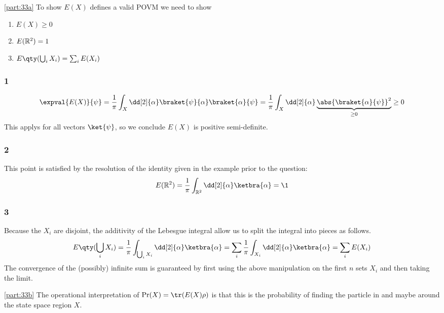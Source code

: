 \documentclass[
	pages,
	boxes,
	color=RoyalPurple
]{homework}
\makeatletter
\numberwithin{tcb@cnt@prob}{section}
\makeatother
\begin{document}
\begin{solution}
    \ref{part:33a}
    To show $E(X)$ defines a valid \ac{POVM} we need to show
    \begin{enumerate}
        \item $E(X)\geq 0$
        \item $E(\mathbb{R}^2) = 1$
        \item $E\qty(\bigcup_i X_i) = \sum_i E(X_i)$
    \end{enumerate}
    \subsubsection*{1}
    \begin{equation*}
        \expval{E(X)}{\psi} = \frac{1}{\pi}\int_X\dd[2]{\alpha}\braket{\psi}{\alpha}\braket{\alpha}{\psi} = \frac{1}{\pi}\int_X\dd[2]{\alpha}\underbrace{\abs{\braket{\alpha}{\psi}}^2}_{\geq 0} \geq 0
    \end{equation*}
    This applys for all vectors $\ket{\psi}$, so we conclude $E(X)$ is positive semi-definite.
    \subsubsection*{2}
    This point is satisfied by the resolution of the identity given in the example prior to the question:
    \begin{equation*}
        E(\R^2) = \frac{1}{\pi}\int_{\R^2}\dd[2]{\alpha}\ketbra{\alpha} = \1
    \end{equation*}
    \subsubsection*{3}
    Because the $X_i$ are disjoint, the additivity of the Lebesgue integral allow us to split the integral into pieces as follows.
    \begin{equation*}
        E\qty(\bigcup_i X_i) = \frac{1}{\pi}\int_{\bigcup_i X_i}\dd[2]{\alpha}\ketbra{\alpha} = \sum_i\frac{1}{\pi}\int_{X_i}\dd[2]{\alpha}\ketbra{\alpha} = \sum_{i}E(X_i)
    \end{equation*}
    The convergence of the (possibly) infinite sum is guaranteed by first using the above manipulation on the first $n$ sets $X_i$ and then taking the limit.

    \ref{part:33b}
    The operational interpretation of $\Pr(X) = \tr(E(X)\rho)$ is that this is the probability of finding the particle in and maybe around the state space region $X$.
\end{solution}
\end{document}
